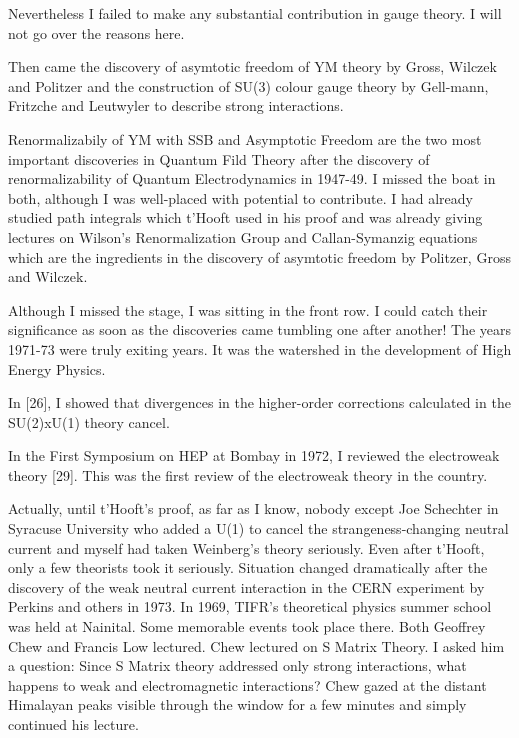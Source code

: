 Nevertheless I failed to make any substantial contribution in gauge 
theory. I will not go over the reasons here.

Then came the discovery of asymtotic freedom of YM theory by Gross, 
Wilczek and Politzer and the construction of SU(3) colour gauge theory 
by Gell-mann, Fritzche and Leutwyler to describe strong interactions.

Renormalizabily of YM with SSB and Asymptotic Freedom are the two most 
important discoveries in Quantum Fild Theory after the discovery of 
renormalizability of Quantum Electrodynamics in 1947-49. I missed the 
boat in both, although I was well-placed with potential to contribute. I 
had already studied path integrals which t'Hooft used in his proof and 
was already giving lectures on Wilson's Renormalization Group and 
Callan-Symanzig equations which are the ingredients in the discovery of 
asymtotic freedom by Politzer, Gross and Wilczek.

Although I missed the stage, I was sitting in the front row. I could 
catch their significance as soon as the discoveries came tumbling one 
after another! The years 1971-73 were truly exi\-ting years. It was the 
watershed in the development of High Ene\-rgy Physics.

In [26], I showed that divergences in the higher-order corrections 
calculated in the SU(2)xU(1) theory cancel.

In the First Symposium on HEP at Bombay in 1972, I reviewed the 
electroweak theory [29]. This was the first review of the electroweak 
theory in the country.
 
Actually, until t'Hooft's proof, as far as I know, nobody except Joe 
Schechter in Syracuse University who added a U(1) to cancel the 
strangeness-changing neutral current and myself had taken Weinberg's 
theory seriously. Even after t'Hooft, only a few theorists took it 
seriously. Situation changed dramatically after the discovery of the 
weak neutral current interaction in the CERN experiment by Perkins and 
others in 1973.
\vskip 1pt
In 1969, TIFR's theoretical physics summer school was held at Nainital. 
Some memorable events took place there. Both Geo\-ffrey Chew and Francis 
Low lectured. Chew lectured on S Matrix Theory. I asked him a question: 
Since S Matrix theory addressed only strong interactions, what happens 
to weak and electromagnetic interactions? Chew gazed at the distant 
Himala\-yan peaks visible through the window for a few minutes and simply 
conti\-nued his lecture.

